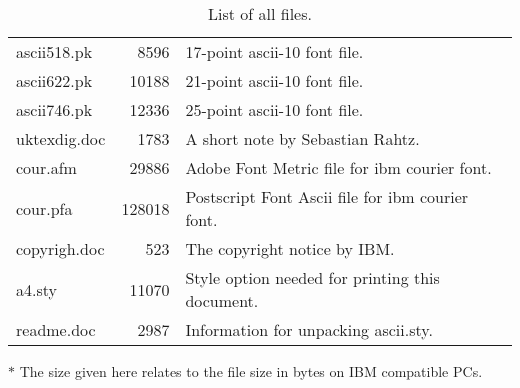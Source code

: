 \begin{table}[h]
\begin{center}
\begin{tabular}{|l|r|l|}
\sc ascii518.pk  & 8596   & 17-point {\sc ascii-10} font file. \\

\sc ascii622.pk  & 10188  & 21-point {\sc ascii-10} font file. \\

\sc ascii746.pk  & 12336  & 25-point {\sc ascii-10} font file. \\

\sc uktexdig.doc & 1783   & A short note by Sebastian Rahtz. \\

\sc cour.afm     & 29886  & Adobe Font Metric file for {\sc ibm courier} font. \\

\sc cour.pfa     & 128018 & Postscript Font Ascii file for {\sc ibm courier} font. \\

\sc copyrigh.doc & 523    & The copyright notice by IBM. \\

\sc a4.sty       & 11070  & Style option needed for printing this document. \\

\sc readme.doc   & 2987   & Information for unpacking {\sc ascii.sty}. \\
\hline
\end{tabular}
\caption{List of all files.}
\label{listoffiles}
\end{center}
\end{table}

\vfill

\strut\makebox[2in]{\hrulefill}

{\footnotesize
${\ast}$ The size given here relates to the file size in bytes on IBM compatible PCs.}

\newpage



